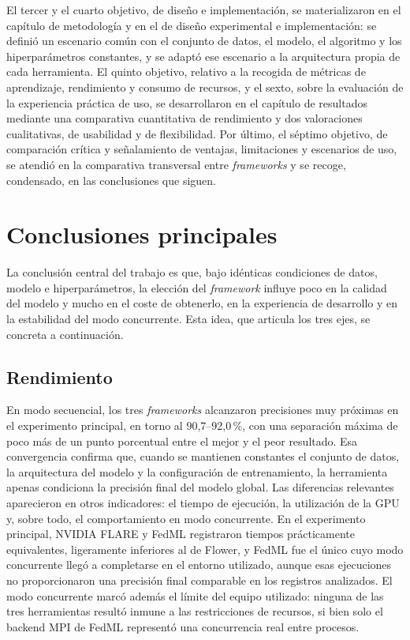 El tercer y el cuarto objetivo, de diseño e implementación, se materializaron en el
capítulo de metodología y en el de diseño experimental e implementación: se definió un
escenario común con el conjunto de datos, el modelo, el algoritmo y los hiperparámetros
constantes, y se adaptó ese escenario a la arquitectura propia de cada herramienta. El
quinto objetivo,
relativo a la recogida de métricas de aprendizaje, rendimiento y consumo de recursos,
y el sexto, sobre la evaluación de la experiencia práctica de uso, se desarrollaron en
el capítulo de resultados mediante una comparativa cuantitativa de rendimiento y dos
valoraciones cualitativas, de usabilidad y de flexibilidad. Por último, el séptimo
objetivo, de comparación crítica y señalamiento de ventajas, limitaciones y escenarios
de uso, se atendió en la comparativa transversal entre \textit{frameworks} y se recoge,
condensado, en las conclusiones que siguen.

\section{Conclusiones principales}
\label{sec:conclusiones-principales}

La conclusión central del trabajo es que, bajo idénticas condiciones de datos, modelo
e hiperparámetros, la elección del \textit{framework} influye poco en la calidad del modelo y
mucho en el coste de obtenerlo, en la experiencia de desarrollo y en la estabilidad
del modo concurrente. Esta idea, que articula los tres ejes, se concreta a
continuación.

\subsection{Rendimiento}
\label{sec:concl-rendimiento}

En modo secuencial, los tres \textit{frameworks} alcanzaron precisiones muy próximas en el
experimento principal, en torno al 90,7--92,0\,\%, con una separación máxima de poco más
de un punto porcentual entre el mejor y el peor resultado. Esa convergencia confirma
que, cuando se mantienen constantes el conjunto de datos, la arquitectura del modelo y
la configuración de entrenamiento, la herramienta apenas condiciona la precisión final
del modelo global. Las diferencias relevantes aparecieron en otros indicadores: el
tiempo de ejecución, la utilización de la GPU y, sobre todo, el comportamiento en modo
concurrente. En el experimento principal, NVIDIA FLARE y FedML registraron tiempos
prácticamente equivalentes, ligeramente inferiores al de Flower, y FedML fue el único cuyo modo
concurrente llegó a completarse en el entorno utilizado, aunque esas ejecuciones no
proporcionaron una precisión final comparable en los registros analizados.
El modo concurrente marcó además el límite del equipo utilizado: ninguna de las tres
herramientas resultó inmune a las restricciones de recursos, si bien solo el backend
MPI de FedML representó una concurrencia real entre procesos.

